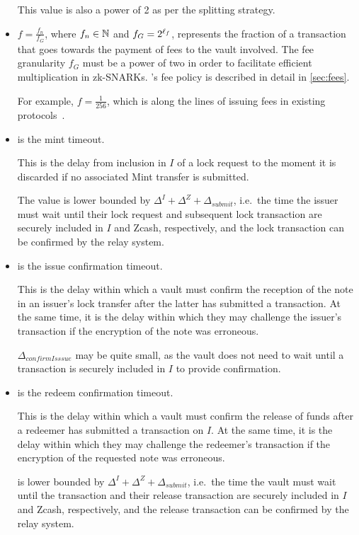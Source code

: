 \begin{itemize}
    This value is also a power of 2 as per the splitting strategy.
    
    \item $f = \frac{f_n}{f_G}$, where $f_n \in \mathbb{N}$ and $f_G = 2^{\ell_{f}}$, represents the fraction of a transaction that goes towards the payment of fees to the vault involved.
    The fee granularity $f_G$ must be a power of two in order to facilitate efficient multiplication in zk-SNARKs.
    \zclaim's fee policy is described in detail in \cref{sec:fees}.
    
    For example, $f = \frac{1}{256}$, which is along the lines of \cba issuing fees in existing protocols~\cite{RenBridgeFAQDarknodes-2020-12-08,WrappedBitcoinWBTCCoinList}.
    
    \item \dm is the mint timeout.
    
    This is the delay from inclusion in $I$ of a lock request to the moment it is discarded if no associated Mint transfer is submitted.
    
    The value \dm is lower bounded by $\Delta^I + \Delta^Z + \Delta_{submit}$, i.e.\ the time the issuer must wait until their lock request and subsequent lock transaction are securely included in $I$ and Zcash, respectively, and the lock transaction can be confirmed by the relay system.
    
    \item \dci is the issue confirmation timeout.
    
    This is the delay within which a vault must confirm the reception of the note in an issuer's lock transfer after the latter has submitted a \mint transaction.
    At the same time, it is the delay within which they may challenge the issuer's \mint transaction if the encryption of the note was erroneous.

    $\Delta_{confirmIsssue}$ may be quite small, as the vault does not need to wait until a \mint transaction is securely included in $I$ to provide confirmation.
    
    
    \item \dcr is the redeem confirmation timeout.
    
    This is the delay within which a vault must confirm the release of funds after a redeemer has submitted a \burn transaction on $I$.
    At the same time, it is the delay within which they may challenge the redeemer's \burn transaction if the encryption of the requested note was erroneous.

    \dcr is lower bounded by $\Delta^I + \Delta^Z + \Delta_{submit}$, i.e.\ the time the vault must wait until the \burn transaction and their release transaction are securely included in $I$ and Zcash, respectively, and the release transaction can be confirmed by the relay system.
    

\end{itemize}
